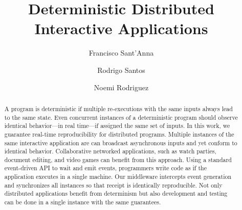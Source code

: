 \documentclass[sigplan,screen]{acmart}
\begin{document}
\title{Deterministic Distributed Interactive Applications}

\author{Francisco Sant'Anna}

\author{Rodrigo Santos}

\author{Noemi Rodriguez}


\begin{abstract}
A program is deterministic if multiple re-executions with the same inputs
always lead to the same state.
Even concurrent instances of a deterministic program should observe identical
behavior---in real time---if assigned the same set of inputs.
%
In this work, we guarantee real-time reproducibility for distributed programs.
Multiple instances of the same interactive application are can broadcast
asynchronous inputs and yet conform to identical behavior.
Collaborative networked applications, such as watch parties, document editing,
and video games can benefit from this approach.
%
Using a standard event-driven API to wait and emit events, programmers write
code as if the application executes in a single machine.
Our middleware intercepts event generation and synchronizes all instances so
that receipt is identically reproducible.
Not only distributed applications benefit from determinism but also development
and testing can be done in a single instance with the same guarantees.
\end{abstract}

\maketitle
\end{document}
